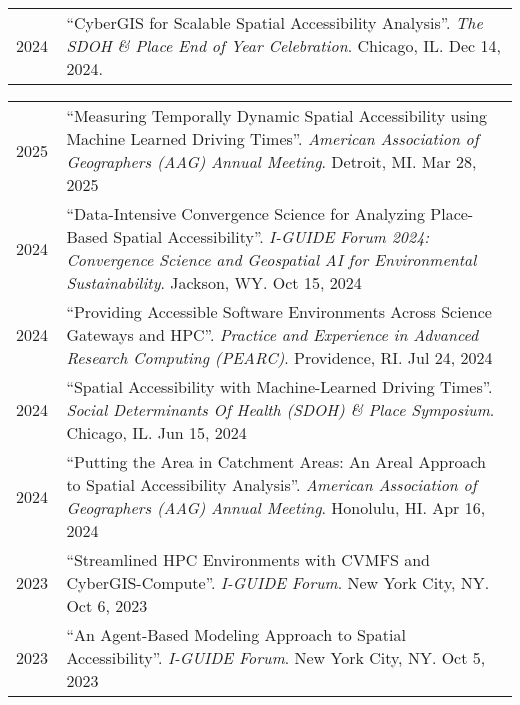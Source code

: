 \documentclass{acmcv}
\begin{document}
\vspace*{0.25cm}


    \begin{longtable}{p{0.1\linewidth} p{0.9\linewidth}}


        2024 & ``CyberGIS for Scalable Spatial Accessibility Analysis''. \textit{The SDOH \& Place End of Year Celebration}. Chicago, IL. Dec 14, 2024. \\
    \end{longtable}
    \vspace*{-0.1cm}


    \begin{longtable}{p{0.1\linewidth} p{0.9\linewidth}}
        2025 & ``Measuring Temporally Dynamic Spatial Accessibility using Machine Learned Driving Times''. \textit{American Association of Geographers (AAG) Annual Meeting}. Detroit, MI. Mar 28, 2025\\

        2024 & ``Data-Intensive Convergence Science for Analyzing Place-Based Spatial Accessibility''. \textit{I-GUIDE Forum 2024: Convergence Science and Geospatial AI for Environmental Sustainability}. Jackson, WY. Oct 15, 2024\\

        2024 & ``Providing Accessible Software Environments Across Science Gateways and HPC''. \textit{Practice and Experience in Advanced Research Computing (PEARC)}. Providence, RI. Jul 24, 2024\\

        2024 & ``Spatial Accessibility with Machine-Learned Driving Times''. \textit{Social Determinants Of Health (SDOH) \& Place Symposium}. Chicago, IL. Jun 15, 2024\\

        2024 & ``Putting the Area in Catchment Areas: An Areal Approach to Spatial Accessibility Analysis''. \textit{American Association of Geographers (AAG) Annual Meeting}. Honolulu, HI. Apr 16, 2024\\

        2023 & ``Streamlined HPC Environments with CVMFS and CyberGIS-Compute''. \textit{I-GUIDE Forum}. New York City, NY. Oct 6, 2023\\

        2023 & ``An Agent-Based Modeling Approach to Spatial Accessibility''. \textit{I-GUIDE Forum}. New York City, NY. Oct 5, 2023\\


\end{longtable}
\end{document}
